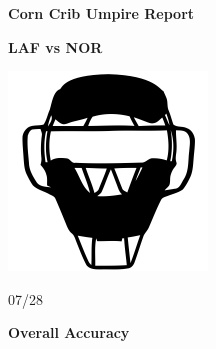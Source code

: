 \documentclass[
]{article}
\author{}
\date{\vspace{-2.5em}}
\begin{document}
\vspace*{-8em}
\begin{center}
\vspace*{-1em}
\LARGE \textbf{Corn Crib Umpire Report}
\vspace*{-1em}
\end{center}

\begin{center}
\begin{minipage}{0.28\textwidth}
\centering
\Large \textbf{LAF vs NOR}
\end{minipage}
\hfill
\begin{minipage}{0.28\textwidth}
\centering
\includegraphics[width=\textwidth]{ump-mask.png}
\end{minipage}
\hfill
\begin{minipage}{0.28\textwidth}
\centering
\Large 07/28
\end{minipage}
\vspace*{-1em}
\end{center}

\begin{center}
\centering
\vspace{1em}
\Large \textbf{Overall Accuracy}
\end{center}
\end{document}
